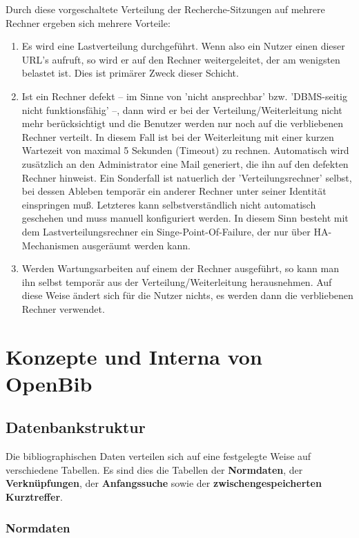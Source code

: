 \documentclass[11pt, twoside, a4paper, BCOR8mm, DIV12, bibtotoc,idxtotoc]{scrbook}
\begin{document}
Durch diese vorgeschaltete Verteilung der Recherche-Sitzungen auf
mehrere Rechner ergeben sich mehrere Vorteile:

\begin{enumerate}
\item Es wird eine Lastverteilung durchgeführt. Wenn also ein Nutzer
  einen dieser URL's aufruft, so wird er auf den Rechner
  weitergeleitet, der am wenigsten belastet ist.  Dies ist primärer
  Zweck dieser Schicht.
\item Ist ein Rechner defekt -- im Sinne von 'nicht ansprechbar'
  bzw. 'DBMS-seitig nicht funk\-tions\-fä\-hig' --, dann wird er bei der
  Verteilung/Weiterleitung nicht mehr berücksichtigt und die Benutzer
  werden nur noch auf die verbliebenen Rechner verteilt. In diesem
  Fall ist bei der Weiterleitung mit einer kurzen Wartezeit von
  maximal 5 Sekunden (Timeout) zu rechnen.  Automatisch wird
  zusätzlich an den Administrator eine Mail ge\-ne\-riert, die ihn
  auf den defekten Rechner hinweist. Ein Sonderfall ist natuerlich der
  'Verteilungs\-rech\-ner' selbst, bei dessen Ableben temporär ein
  anderer Rechner unter seiner Identität einspringen muß. Letzteres
  kann selbstverständlich nicht automatisch geschehen und muss
  manuell konfiguriert werden. In diesem Sinn besteht mit dem
  Lastverteilungsrechner ein Singe-Point-Of-Failure, der nur über
  HA-Mechanismen ausgeräumt werden kann.
\item Werden Wartungsarbeiten auf einem der Rechner ausgeführt, so
  kann man ihn selbst temporär aus der Verteilung/Weiterleitung
  herausnehmen. Auf diese Weise ändert sich für die Nutzer nichts,
  es werden dann die verbliebenen Rechner verwendet.
\end{enumerate}


\chapter{Konzepte und Interna von OpenBib}


\section{Datenbankstruktur}

Die bibliographischen Daten verteilen sich auf eine festgelegte Weise
auf verschiedene Tabellen. Es sind dies die Tabellen der
\textbf{Normdaten}, der \textbf{Verknüpfungen}, der \textbf{Anfangssuche}
sowie der \textbf{zwischengespeicherten Kurztreffer}.


\subsection{Normdaten}
\end{document}
